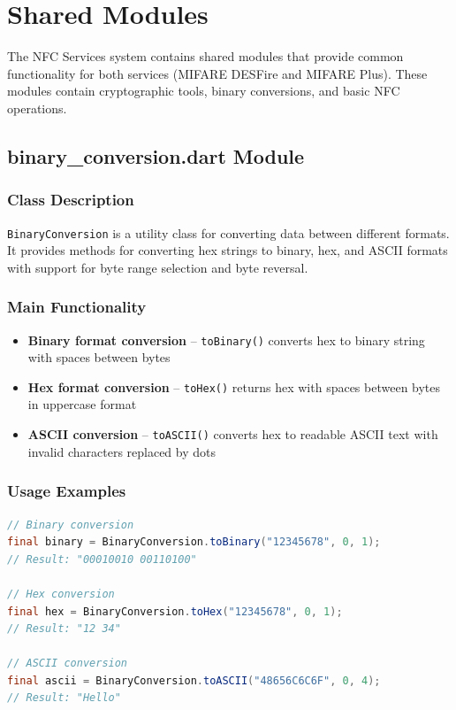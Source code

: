 \documentclass[a4paper,12pt]{article}
\begin{document}
\section{Shared Modules}

The NFC Services system contains shared modules that provide common functionality for both services (MIFARE DESFire and MIFARE Plus). These modules contain cryptographic tools, binary conversions, and basic NFC operations.

\subsection{binary\_conversion.dart Module}

\subsubsection{Class Description}
\texttt{BinaryConversion} is a utility class for converting data between different formats. It provides methods for converting hex strings to binary, hex, and ASCII formats with support for byte range selection and byte reversal.

\subsubsection{Main Functionality}
\begin{itemize}
    \item \textbf{Binary format conversion} -- \texttt{toBinary()} converts hex to binary string with spaces between bytes
    \item \textbf{Hex format conversion} -- \texttt{toHex()} returns hex with spaces between bytes in uppercase format
    \item \textbf{ASCII conversion} -- \texttt{toASCII()} converts hex to readable ASCII text with invalid characters replaced by dots
\end{itemize}

\subsubsection{Usage Examples}
\begin{lstlisting}[language=Java]
// Binary conversion
final binary = BinaryConversion.toBinary("12345678", 0, 1);
// Result: "00010010 00110100"

// Hex conversion
final hex = BinaryConversion.toHex("12345678", 0, 1);
// Result: "12 34"

// ASCII conversion
final ascii = BinaryConversion.toASCII("48656C6C6F", 0, 4);
// Result: "Hello"
\end{lstlisting}
\end{document}
